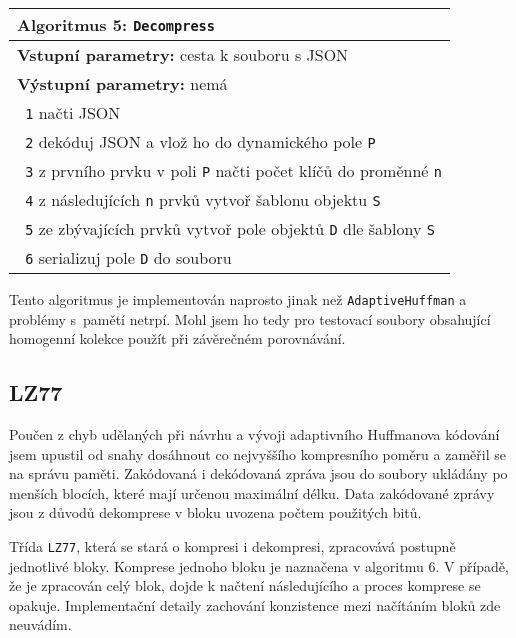 \begin{table}[!h]
\centering
\begin{tabular}{|l|}
\hline
\textbf{Algoritmus 5:} \texttt{Decompress}\\
\hline
\textbf{Vstupní parametry:} cesta k souboru s JSON\\
\textbf{Výstupní parametry:} nemá\\
\hline
\texttt{ 1} načti JSON\\
\texttt{ 2} dekóduj JSON a vlož ho do dynamického pole \texttt{P}\\
\texttt{ 3} z prvního prvku v poli \texttt{P} načti počet klíčů do proměnné \texttt{n}\\
\texttt{ 4} z následujících \texttt{n} prvků vytvoř šablonu objektu \texttt{S}\\
\texttt{ 5} ze zbývajících prvků vytvoř pole objektů \texttt{D} dle šablony \texttt{S}\\
\texttt{ 6} serializuj pole \texttt{D} do souboru\\
\hline
\end{tabular}
\end{table}

Tento algoritmus je implementován naprosto jinak než \texttt{AdaptiveHuffman} a problémy s~pamětí netrpí. Mohl jsem ho tedy pro testovací soubory obsahující homogenní kolekce použít při závěrečném porovnávání.

\subsection{LZ77}
Poučen z chyb udělaných při návrhu a vývoji adaptivního Huffmanova kódování jsem upustil od snahy dosáhnout co nejvyššího kompresního poměru a zaměřil se na správu paměti. Zakódovaná i dekódovaná zpráva jsou do soubory ukládány po menších blocích, které mají určenou maximální délku. Data zakódované zprávy jsou z důvodů dekomprese v bloku uvozena počtem použitých bitů.

Třída \texttt{LZ77}, která se stará o kompresi i dekompresi, zpracovává postupně jednotlivé bloky. Komprese jednoho bloku je naznačena v algoritmu 6. V případě, že je zpracován celý blok, dojde k načtení následujícího a proces komprese se opakuje. Implementační detaily zachování konzistence mezi načítáním bloků zde neuvádím.

